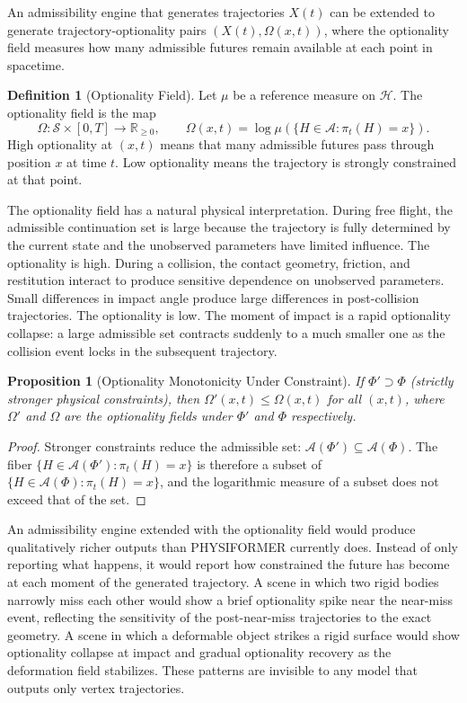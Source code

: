 \documentclass[12pt,oneside]{article}
\newtheorem{proposition}[theorem]{Proposition}
\theoremstyle{definition}
\newtheorem{definition}[theorem]{Definition}
\newcommand{\A}{\mathcal{A}}
\newcommand{\H}{\mathcal{H}}
\begin{document}
An admissibility engine that generates trajectories \(X(t)\) can be extended to
generate trajectory-optionality pairs \((X(t), \Omega(x, t))\), where the
optionality field measures how many admissible futures remain available at each
point in spacetime.

\begin{definition}[Optionality Field]
Let \(\mu\) be a reference measure on \(\H\). The optionality field is the map
\[
\Omega : \mathcal{S} \times [0, T] \to \mathbb{R}_{\geq 0}, \qquad
\Omega(x, t) = \log \mu\!\left(\{H \in \A : \pi_t(H) = x\}\right).
\]
High optionality at \((x, t)\) means that many admissible futures pass through
position \(x\) at time \(t\). Low optionality means the trajectory is strongly
constrained at that point.
\end{definition}

The optionality field has a natural physical interpretation. During free flight,
the admissible continuation set is large because the trajectory is fully determined
by the current state and the unobserved parameters have limited influence. The
optionality is high. During a collision, the contact geometry, friction, and
restitution interact to produce sensitive dependence on unobserved parameters.
Small differences in impact angle produce large differences in post-collision
trajectories. The optionality is low. The moment of impact is a rapid optionality
collapse: a large admissible set contracts suddenly to a much smaller one as the
collision event locks in the subsequent trajectory.

\begin{proposition}[Optionality Monotonicity Under Constraint]
If \(\Phi' \supset \Phi\) (strictly stronger physical constraints), then
\(\Omega'(x, t) \leq \Omega(x, t)\) for all \((x, t)\), where \(\Omega'\) and
\(\Omega\) are the optionality fields under \(\Phi'\) and \(\Phi\) respectively.
\end{proposition}

\begin{proof}
Stronger constraints reduce the admissible set: \(\A(\Phi') \subseteq \A(\Phi)\).
The fiber \(\{H \in \A(\Phi') : \pi_t(H) = x\}\) is therefore a subset of
\(\{H \in \A(\Phi) : \pi_t(H) = x\}\), and the logarithmic measure of a subset
does not exceed that of the set.
\end{proof}

An admissibility engine extended with the optionality field would produce qualitatively
richer outputs than PHYSIFORMER currently does. Instead of only reporting what happens,
it would report how constrained the future has become at each moment of the generated
trajectory. A scene in which two rigid bodies narrowly miss each other would show a
brief optionality spike near the near-miss event, reflecting the sensitivity of the
post-near-miss trajectories to the exact geometry. A scene in which a deformable
object strikes a rigid surface would show optionality collapse at impact and gradual
optionality recovery as the deformation field stabilizes. These patterns are invisible
to any model that outputs only vertex trajectories.
\end{document}
